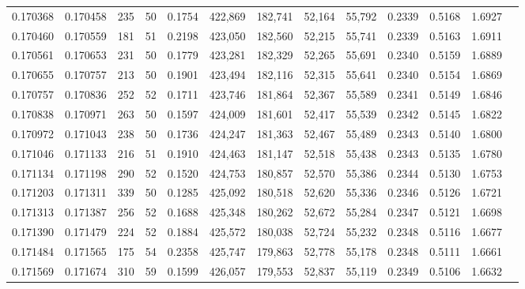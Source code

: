 \begin{tabular}{rrrrrrrrrrrrr}
0.170368 & 0.170458 &   235 &  50 &                                     0.1754 & 422,869 & 182,741 &  52,164 &  55,792 & 0.2339 & 0.5168 & 1.6927 \\
0.170460 & 0.170559 &   181 &  51 &                                     0.2198 & 423,050 & 182,560 &  52,215 &  55,741 & 0.2339 & 0.5163 & 1.6911 \\
0.170561 & 0.170653 &   231 &  50 &                                     0.1779 & 423,281 & 182,329 &  52,265 &  55,691 & 0.2340 & 0.5159 & 1.6889 \\
0.170655 & 0.170757 &   213 &  50 &                                     0.1901 & 423,494 & 182,116 &  52,315 &  55,641 & 0.2340 & 0.5154 & 1.6869 \\
0.170757 & 0.170836 &   252 &  52 &                                     0.1711 & 423,746 & 181,864 &  52,367 &  55,589 & 0.2341 & 0.5149 & 1.6846 \\
0.170838 & 0.170971 &   263 &  50 &                                     0.1597 & 424,009 & 181,601 &  52,417 &  55,539 & 0.2342 & 0.5145 & 1.6822 \\
0.170972 & 0.171043 &   238 &  50 &                                     0.1736 & 424,247 & 181,363 &  52,467 &  55,489 & 0.2343 & 0.5140 & 1.6800 \\
0.171046 & 0.171133 &   216 &  51 &                                     0.1910 & 424,463 & 181,147 &  52,518 &  55,438 & 0.2343 & 0.5135 & 1.6780 \\
0.171134 & 0.171198 &   290 &  52 &                                     0.1520 & 424,753 & 180,857 &  52,570 &  55,386 & 0.2344 & 0.5130 & 1.6753 \\
0.171203 & 0.171311 &   339 &  50 &                                     0.1285 & 425,092 & 180,518 &  52,620 &  55,336 & 0.2346 & 0.5126 & 1.6721 \\
0.171313 & 0.171387 &   256 &  52 &                                     0.1688 & 425,348 & 180,262 &  52,672 &  55,284 & 0.2347 & 0.5121 & 1.6698 \\
0.171390 & 0.171479 &   224 &  52 &                                     0.1884 & 425,572 & 180,038 &  52,724 &  55,232 & 0.2348 & 0.5116 & 1.6677 \\
0.171484 & 0.171565 &   175 &  54 &                                     0.2358 & 425,747 & 179,863 &  52,778 &  55,178 & 0.2348 & 0.5111 & 1.6661 \\
0.171569 & 0.171674 &   310 &  59 &                                     0.1599 & 426,057 & 179,553 &  52,837 &  55,119 & 0.2349 & 0.5106 & 1.6632 \\

\end{tabular}
